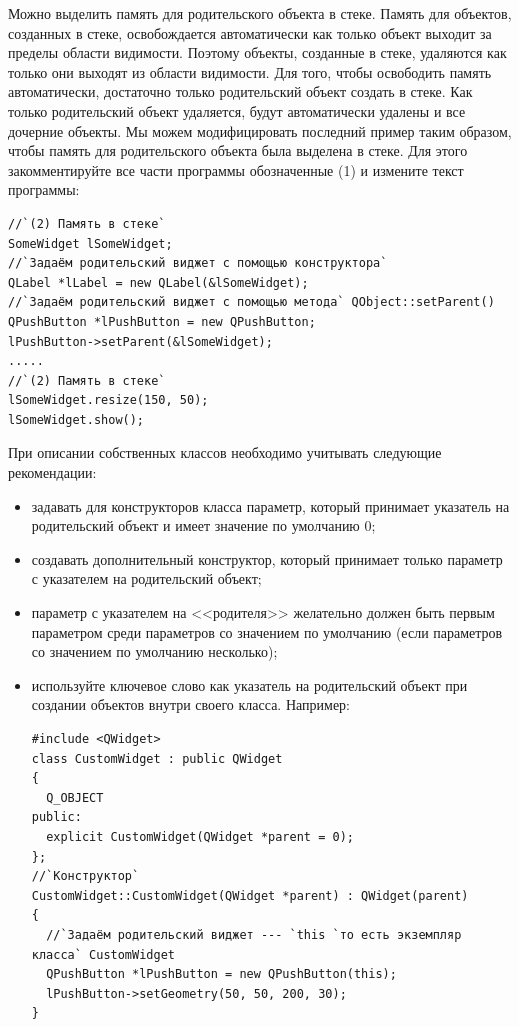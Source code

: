 Можно выделить память для родительского объекта в стеке. Память для объектов, созданных в стеке, освобождается
автоматически как только объект выходит за пределы области видимости. Поэтому объекты, созданные в стеке, удаляются как
только они выходят из области видимости. Для того, чтобы освободить память автоматически, достаточно только
родительский объект создать в стеке. Как только родительский объект удаляется, будут автоматически удалены и все
дочерние объекты. Мы можем модифицировать последний пример таким образом, чтобы память для родительского объекта была
выделена в стеке. Для этого закомментируйте все части программы обозначенные (1) и измените текст
программы:
\begin{lstlisting}
//`(2) Память в стеке`
SomeWidget lSomeWidget;
//`Задаём родительский виджет с помощью конструктора`
QLabel *lLabel = new QLabel(&lSomeWidget);
//`Задаём родительский виджет с помощью метода` QObject::setParent()
QPushButton *lPushButton = new QPushButton;
lPushButton->setParent(&lSomeWidget);
.....
//`(2) Память в стеке`
lSomeWidget.resize(150, 50);
lSomeWidget.show();
\end{lstlisting}

При описании собственных классов необходимо учитывать следующие рекомендации:

\begin{itemize}
\item задавать для конструкторов класса параметр, который принимает указатель на родительский объект и имеет значение по
умолчанию 0;
\item создавать дополнительный конструктор, который принимает только параметр с указателем на родительский объект;
\item параметр с указателем на <<родителя>> желательно должен быть первым параметром среди параметров со
значением по умолчанию (если параметров со значением по умолчанию несколько);
\item используйте ключевое слово  как указатель на родительский объект при создании объектов внутри своего
класса. Например:
\begin{lstlisting}
#include <QWidget>
class CustomWidget : public QWidget
{
  Q_OBJECT
public:
  explicit CustomWidget(QWidget *parent = 0);
};
//`Конструктор`
CustomWidget::CustomWidget(QWidget *parent) : QWidget(parent)
{
  //`Задаём родительский виджет --- `this `то есть экземпляр класса` CustomWidget
  QPushButton *lPushButton = new QPushButton(this); 
  lPushButton->setGeometry(50, 50, 200, 30);
}
\end{lstlisting}
\end{itemize}

